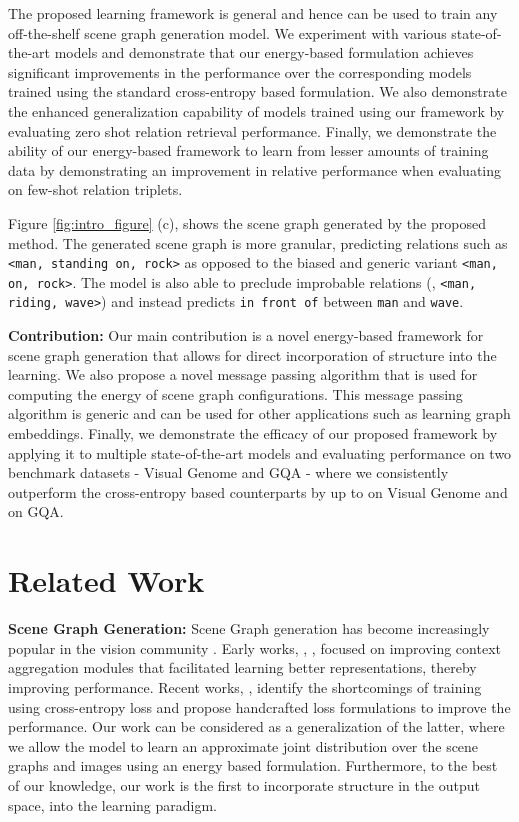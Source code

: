 \documentclass[final]{cvpr}
\begin{document}
The proposed learning framework is general and hence can be used to train any off-the-shelf scene graph generation model. We experiment with various state-of-the-art models and demonstrate that our energy-based formulation achieves significant improvements in the performance over the corresponding models trained using the standard cross-entropy based formulation. We also demonstrate the enhanced generalization capability of models trained using our framework by evaluating zero shot relation retrieval performance. Finally, we demonstrate the ability of our energy-based framework to learn from lesser amounts of training data by demonstrating an improvement in relative performance when evaluating on few-shot relation triplets. 

Figure \ref{fig:intro_figure} (c), shows the scene graph generated by the proposed method. The generated scene graph is more granular, predicting relations such as \texttt{<man, standing on, rock>} as opposed to the biased and generic variant \texttt{<man, on, rock>}. The model is also able to preclude improbable relations (\eg, \texttt{<man, riding, wave>}) and instead predicts \texttt{in front of} between \texttt{man} and \texttt{wave}.

\vspace{0.06in}
\noindent
\textbf{Contribution:} Our main contribution is a novel energy-based framework for scene graph generation that allows for direct incorporation of structure into the learning. We also propose a novel message passing algorithm that is used for computing the energy of scene graph configurations. This message passing algorithm is generic and can be used for other applications such as learning graph embeddings. Finally, we demonstrate the efficacy of our proposed framework by applying it to multiple state-of-the-art models and evaluating performance on 
two benchmark datasets - Visual Genome \cite{krishna2017visual} and GQA \cite{hudson2018gqa} - where we consistently outperform the cross-entropy based counterparts by up to  on Visual Genome and  on GQA.

\section{Related Work}
\noindent
\textbf{Scene Graph Generation:}
Scene Graph generation has become increasingly popular in the vision community  \cite{knyazev2020graph, li2018fnet, Lin_2020_CVPR, newell2017pixels, tang2020unbiased, xu2017scene, yang2018graph, ZareianKC20, ZareianWYC20, zellers2018neural}. Early works, \eg,  \cite{xu2017scene, yang2018graph, zellers2018neural}, focused on improving context aggregation modules that facilitated learning better representations, thereby improving performance. Recent works, \cite{knyazev2020graph, Lin_2020_CVPR, zhang2019graphical}, identify the shortcomings of training using cross-entropy loss and propose handcrafted loss formulations to improve the performance. Our work can be considered as a generalization of the latter, where we allow the model to learn an approximate joint distribution over the scene graphs and images using an energy based formulation. Furthermore, to the best of our knowledge, our work is the first to incorporate structure in the output space, into the learning paradigm.
\end{document}
